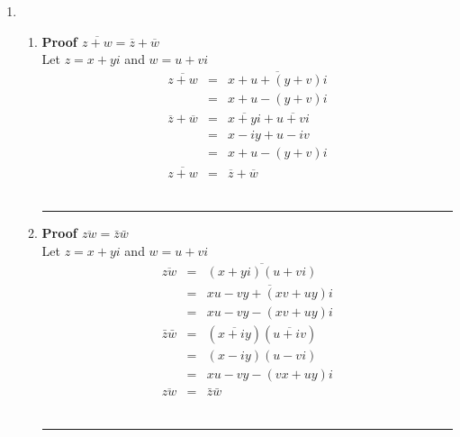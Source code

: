 \documentclass{article}%
\newenvironment{proof}[1][]{\textbf{Proof #1} }{\ \rule{0.5em}{0.5em}}
\begin{document}
\begin{enumerate}
\begin{enumerate}[label*=\arabic*.]
\begin{enumerate}[label=\alph*]
\begin{proof}[$r(wz)=(rw)z$]
\begin{eqnarray*}
                         &=&pux-pvy-qvx-quy+(puy-qvy+pvx+qux)i \\
                    r(wz)&=&(rw)z 
               \end{eqnarray*}
            \end{proof}
        \end{enumerate}
        \item
        \begin{enumerate}[label=\alph*]
            \item
            \begin{proof}[$\overline{z+w}=\overline{z}+\overline{w}$]
                \\ Let $z=x+yi$ and $w=u+vi$
                \begin{eqnarray*}
                    \overline{z+w}&=&\overline{x+u+(y+v)i} \\
                                  &=&x+u-(y+v)i \\
                    \overline{z}+\overline{w}&=&\overline{x+yi}+\overline{u+vi} \\
                                             &=&x-iy+u-iv \\
                                             &=&x+u-(y+v)i \\
                    \overline{z+w}&=&\overline{z}+\overline{w}
                \end{eqnarray*}
            \end{proof}
            \item
            \begin{proof}[$\overline{zw}=\bar{z}\bar{w}$]
                \\ Let $z=x+yi$ and $w=u+vi$
                \begin{eqnarray*}
                    \overline{zw}&=&\overline{(x+yi)(u+vi)} \\
                                 &=&\overline{xu-vy+(xv+uy)i} \\
                                 &=&xu-vy-(xv+uy)i \\
                    \bar{z}\bar{w}&=&(\overline{x+iy})(\overline{u+iv}) \\
                                  &=&(x-iy)(u-vi) \\
                                  &=&xu-vy-(vx+uy)i \\
                    \overline{zw}&=&\bar{z}\bar{w}
                \end{eqnarray*}
            \end{proof}

\end{enumerate}
\end{enumerate}
\end{enumerate}
\end{document}
